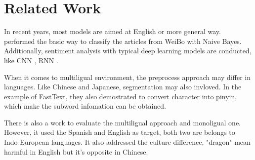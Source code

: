 \chapter{Related Work}

In recent years, most models are aimed at English or more general way. 
\cite{zhao2012moodlens} performed the basic way to classify the articles from WeiBo with Naive Bayes.  \\


Additionally, sentiment analysis with typical deep learning models are conducted, like CNN 
\cite{kim2014convolutional}, RNN \cite{arevian2007recurrent}. 

When it comes to multiligual environment, the preprocess approach may differ in languages. Like Chinese and Japanese, segmentation may also invloved.
In the example of FastText\cite{joulin2016fasttext}, they also demostrated to convert character into pinyin, which make the subword infomation can be obtained. 

There is also a work\cite{multilingual} to evaluate the multiligual approach and monoligual one. However, it used the Spanish and English as target, both two are belongs 
to Indo-European languages. It also addressed the culture difference, "dragon" mean harmful in English but it's opposite in Chinese. 
